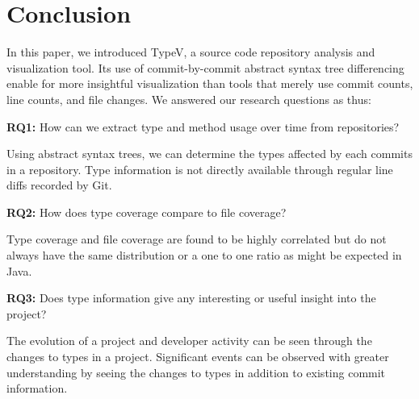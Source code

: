 \section{Conclusion}

In this paper, we introduced TypeV, a source code repository analysis and visualization tool. Its use of commit-by-commit abstract syntax tree differencing enable for more insightful visualization than tools that merely use commit counts, line counts, and file changes. We answered our research questions as thus:

\textbf{RQ1:} How can we extract type and method usage over time from repositories?

\begin{framed}
\noindent
Using abstract syntax trees, we can determine the types affected by each commits in a repository. Type information is not directly available through regular line diffs recorded by Git.
\end{framed}

\textbf{RQ2:} How does type coverage compare to file coverage?

\begin{framed}
\noindent
Type coverage and file coverage are found to be highly correlated but do not always have the same distribution or a one to one ratio as might be expected in Java.
\end{framed}

\textbf{RQ3:} Does type information give any interesting or useful insight into the project?

\begin{framed}
\noindent
The evolution of a project and developer activity can be seen through the changes to types in a project. Significant events can be observed with greater understanding by seeing the changes to types in addition to existing commit information.
\end{framed}




